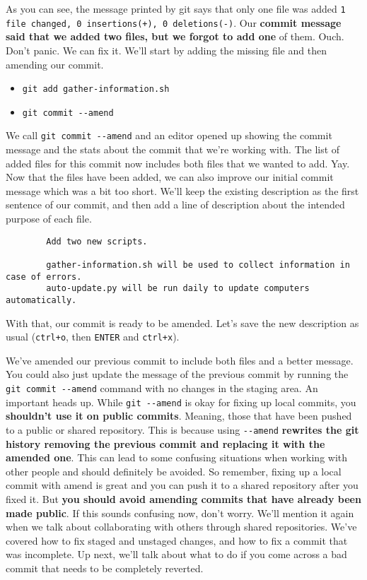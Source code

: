 	As you can see, the message printed by git says that only one file was added \texttt{1 file changed, 0 insertions(+), 0 deletions(-)}. Our \textbf{commit message said that we added two files, but we forgot to add one} of them. Ouch. Don't panic. We can fix it. We'll start by adding the missing file and then amending our commit.
	
	\begin{itemize}
		\item \verb|git add gather-information.sh|
		\item \verb|git commit --amend|
	\end{itemize}

	We call \verb|git commit --amend| and an editor opened up showing the commit message and the stats about the commit that we're working with. The list of added files for this commit now includes both files that we wanted to add. Yay. Now that the files have been added, we can also improve our initial commit message which was a bit too short. We'll keep the existing description as the first sentence of our commit, and then add a line of description about the intended purpose of each file.
	
	\begin{verbatim}
		Add two new scripts.
		
		gather-information.sh will be used to collect information in case of errors.
		auto-update.py will be run daily to update computers automatically.
	\end{verbatim}
	
	With that, our commit is ready to be amended. Let's save the new description as usual (\verb|ctrl+o|, then \verb|ENTER| and \verb|ctrl+x|).
	
	We've amended our previous commit to include both files and a better message. You could also just update the message of the previous commit by running the \verb|git commit --amend| command with no changes in the staging area. An important heads up. While \verb|git --amend| is okay for fixing up local commits, you \textbf{shouldn't use it on public commits}. Meaning, those that have been pushed to a public or shared repository. This is because using \verb|--amend| \textbf{rewrites the git history removing the previous commit and replacing it with the amended one}. This can lead to some confusing situations when working with other people and should definitely be avoided. So remember, fixing up a local commit with amend is great and you can push it to a shared repository after you fixed it. But\textbf{ you should avoid amending commits that have already been made public}. If this sounds confusing now, don't worry. We'll mention it again when we talk about collaborating with others through shared repositories. We've covered how to fix staged and unstaged changes, and how to fix a commit that was incomplete. Up next, we'll talk about what to do if you come across a bad commit that needs to be completely reverted.
	
